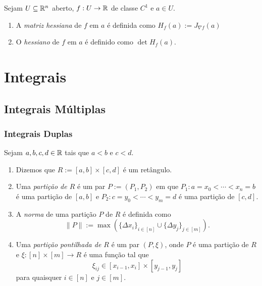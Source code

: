 \begin{definition}
    Sejam $U \subseteq \mathbb{R}^n$ aberto, $f : U \to \mathbb{R}$ de classe $C^1$ e $a \in U$.
        \begin{enumerate}[leftmargin=*, align=left, label=\textbf{(\alph*)}]
            \item A \emph{matriz hessiana} de $f$ em $a$ é definida como $H_f(a) := J_{\nabla f}(a)$
            \item O \emph{hessiano} de $f$ em $a$ é definido como $\det H_f(a)$.
        \end{enumerate}
\end{definition}

\chapter{Integrais}

\section{Integrais Múltiplas}

\subsection{Integrais Duplas}

\begin{definition}
    Sejam $a,b,c,d \in \mathbb{R}$ tais que $a<b$ e $c<d$.
        \begin{enumerate}[leftmargin=*, align=left, label=\textbf{(\alph*)}]
            \item Dizemos que $R := [a,b] \times [c,d]$ é um retângulo.
            \item Uma \emph{partição de $R$} é um par $P := (P_1, P_2)$ em que $P_1 : a = x_0 < \cdots < x_n = b$ é uma partição de $[a,b]$ e $P_2 : c = y_0 < \cdots < y_m = d$ é uma partição de $[c,d]$.
            \item A \emph{norma} de uma partição $P$ de $R$ é definida como
                \[
                    \|P\| := \max{\left(\{\Delta x_i\}_{i \in [n]} \cup \{\Delta y_j\}_{j \in [m]} \right)}.
                \]
            \item Uma \emph{partição pontilhada de $R$} é um par $(P, \xi)$, onde $P$ é uma partição de $R$ e $\xi : [n] \times [m] \to R$ é uma função tal que
                \[
                    \xi_{ij} \in [x_{i-1}, x_i] \times [y_{j-1}, y_j] 
                \]
            para quaisquer $i \in [n]$ e $j \in [m]$.
        \end{enumerate}
\end{definition}

